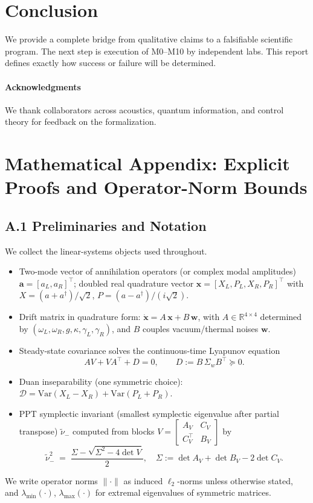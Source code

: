 \documentclass[11pt]{article}
\begin{document}
\section{Conclusion}
We provide a complete bridge from qualitative claims to a falsifiable scientific program. The next step is execution of M0--M10 by independent labs. This report defines exactly how success or failure will be determined.

\paragraph{Acknowledgments}
We thank collaborators across acoustics, quantum information, and control theory for feedback on the formalization.

\appendix
\section*{Mathematical Appendix: Explicit Proofs and Operator-Norm Bounds}

\subsection*{A.1 Preliminaries and Notation}
We collect the linear-systems objects used throughout.
\begin{itemize}
  \item Two-mode vector of annihilation operators (or complex modal amplitudes) $\mathbf a=[a_L,a_R]^\top$; doubled real quadrature vector $\mathbf x=[X_L,P_L,X_R,P_R]^\top$ with $X=(a+a^\dagger)/\sqrt2$, $P=(a-a^\dagger)/(i\sqrt2)$.
  \item Drift matrix in quadrature form: $\dot{\mathbf x}=A\,\mathbf x + B\,\mathbf w$, with $A\in\mathbb R^{4\times 4}$ determined by $(\omega_L,\omega_R, g,\kappa,\gamma_L,\gamma_R)$, and $B$ couples vacuum/thermal noises $\mathbf w$.
  \item Steady-state covariance solves the continuous-time Lyapunov equation
  \begin{equation}
    A V + V A^\top + D = 0, \qquad D := B\,\Sigma_w B^\top \succeq 0.
    \label{eq:Lyap}
  \end{equation}
  \item Duan inseparability (one symmetric choice): $\mathcal D=\mathrm{Var}(X_L-X_R)+\mathrm{Var}(P_L+P_R)$.
  \item PPT symplectic invariant (smallest symplectic eigenvalue after partial transpose) $\tilde\nu_-$ computed from blocks $V=\begin{bmatrix}A_V & C_V\\ C_V^\top & B_V\end{bmatrix}$ by
  \begin{equation}
    \tilde\nu_-^2 \;=\; \frac{ \Sigma - \sqrt{\Sigma^2 - 4\det V} }{2}, \quad \Sigma:=\det A_V + \det B_V - 2\det C_V.
    \label{eq:nuPPT}
  \end{equation}
\end{itemize}
We write operator norms $\|\cdot\|$ as induced $\ell_2$-norms unless otherwise stated, and $\lambda_{\min}(\cdot)$, $\lambda_{\max}(\cdot)$ for extremal eigenvalues of symmetric matrices.
\end{document}
